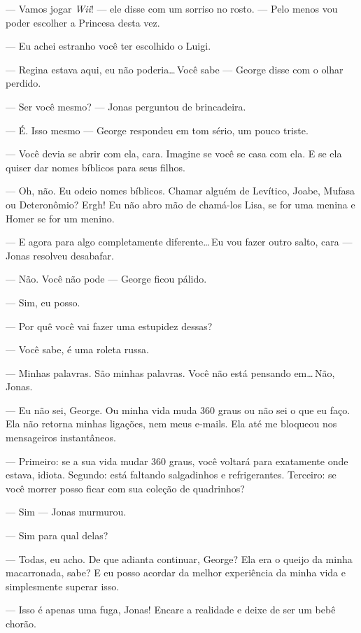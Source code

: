 --- Vamos jogar \emph{Wii}! --- ele disse\mudanca{,} com um sorriso no rosto. --- Pelo menos vou poder escolher a Princesa desta vez.

--- Eu achei estranho você ter escolhido o Luigi.

--- Regina estava aqui, eu não poderia\ldots\,Você sabe --- George disse\mudanca{,} com o olhar perdido.

--- Ser você mesmo? --- Jonas perguntou de brincadeira.

--- É. Isso mesmo --- George respondeu em tom sério, um pouco triste.

--- Você devia se abrir com ela, cara. Imagine se você se casa com ela. E se ela quiser dar nomes bíblicos para seus filhos.

--- Oh, não. Eu odeio nomes bíblicos. Chamar alguém de Levítico, Joabe, Mufasa ou Deteronômio? Ergh! Eu não abro mão de chamá-los Lisa, se for uma menina\mudanca{,} e Homer\mudanca{,} se for um menino.

--- E agora\mudanca{,} para algo completamente diferente\ldots\,Eu vou fazer outro salto, cara --- Jonas resolveu desabafar.

--- Não. Você não pode --- George ficou pálido.

--- Sim, eu posso.

--- Por quê você vai fazer uma estupidez dessas?

--- Você sabe, é uma roleta russa.

--- Minhas palavras. São minhas palavras. Você não está pensando em\ldots\,Não, Jonas.

--- Eu não sei, George. Ou minha vida muda 360 graus ou não sei o que eu faço. Ela não retorna minhas ligações, nem meus e-mails. Ela até me bloqueou nos mensageiros instantâneos.

--- Primeiro: se a sua vida mudar 360 graus, você voltará para exatamente onde estava, idiota. Segundo: está faltando salgadinhos e refrigerantes. Terceiro: se você morrer\mudanca{,} posso ficar com sua coleção de quadrinhos?

--- Sim --- Jonas murmurou.

--- Sim para qual delas?

--- Todas, eu acho. De que adianta continuar, George? Ela era o queijo da minha macarronada, sabe? E eu posso acordar da melhor experiência da minha vida e simplesmente superar isso.

--- Isso é apenas uma fuga, Jonas! Encare a realidade e deixe de ser um bebê chorão.

